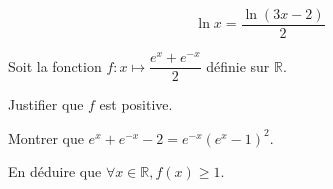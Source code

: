 \documentclass[a4paper,12pt]{scrartcl}
\begin{document}

\begin{equation*}
 \ln x = \dfrac{\ln(3x-2)}{2}
\end{equation*}

\exo[4]{}
Soit la fonction $f: x \longmapsto \dfrac{e^x + e^{-x}}{2}$ définie sur $\mathbb{R}$.

\question{}
Justifier que $f$ est positive.

\question{}
Montrer que $e^x + e^{-x} - 2 = e^{-x}(e^x - 1)^2$.

En déduire que $\forall x \in \mathbb{R}, f(x) \geqslant 1$.
\end{document}
